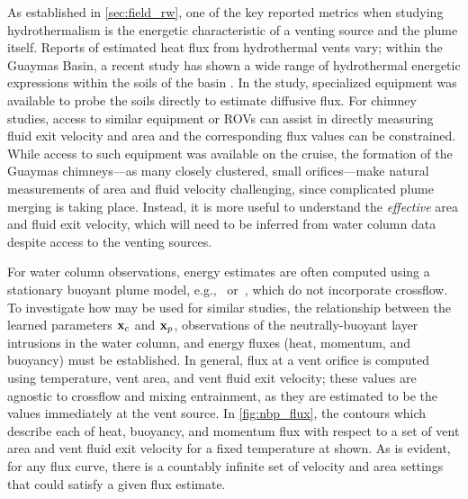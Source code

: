 As established in \cref{sec:field_rw}, one of the key reported metrics when studying hydrothermalism is the energetic characteristic of a venting source and the plume itself. Reports of estimated heat flux from hydrothermal vents vary; within the Guaymas Basin, a recent study has shown a wide range of hydrothermal energetic expressions within the soils of the basin \autocite{geilert2018formation}. In the study, specialized equipment was available to probe the soils directly to estimate diffusive flux. For chimney studies, access to similar equipment or ROVs can assist in directly measuring fluid exit velocity and area and the corresponding flux values can be constrained. While access to such equipment was available on the cruise, the formation of the Guaymas chimneys---as many closely clustered, small orifices---make natural measurements of area and fluid velocity challenging, since complicated plume merging is taking place. Instead, it is more useful to understand the \emph{effective} area and fluid exit velocity, which will need to be inferred from water column data despite access to the venting sources. 

For water column observations, energy estimates are often computed using a stationary buoyant plume model, e.g.,~\cite{morton1956turbulent} or~\cite{speer1989model}, which do not incorporate crossflow. To investigate how \PHUMES may be used for similar studies, the relationship between the learned parameters $\mathbf{x}_c$ and $\mathbf{x}_p$, observations of the neutrally-buoyant layer intrusions in the water column, and energy fluxes (heat, momentum, and buoyancy) must be established. In general, flux at a vent orifice is computed using temperature, vent area, and vent fluid exit velocity; these values are agnostic to crossflow and mixing entrainment, as they are estimated to be the values immediately at the vent source. In \cref{fig:nbp_flux}, the contours which describe each of heat, buoyancy, and momentum flux with respect to a set of vent area and vent fluid exit velocity for a fixed temperature at shown. As is evident, for any flux curve, there is a countably infinite set of velocity and area settings that could satisfy a given flux estimate.

